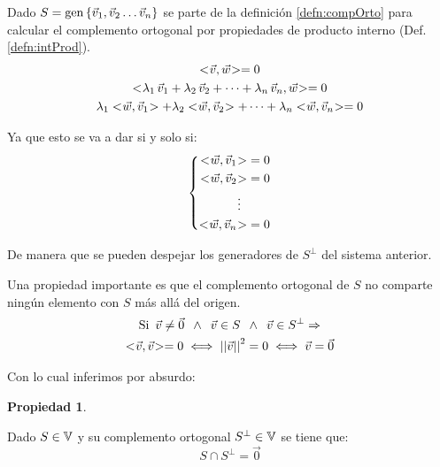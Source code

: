 \documentclass[a5paper,12pt,twoside]{book}
\newtheorem{prop}{{Propiedad}}[chapter]
\begin{document}
Dado $S=\operatorname{gen}{ \left\{ {\Vec{v}_1,\Vec{v}_2 \dots \Vec{v}_n} \right\} }$ se parte de la definición \ref{defn:compOrto} para calcular el complemento ortogonal por propiedades de producto interno (Def. \ref{defn:intProd}).
\begin{gather*}
    \intProd{\Vec{v}}{\Vec{w}} = 0
    \\
    \intProd{\lambda_1 \, \Vec{v}_1 + \lambda_2 \, \Vec{v}_2 + \dots + \lambda_\nth \, \Vec{v}_\nth}{\Vec{w}} = 0
    \\
    \lambda_1 \intProd{\Vec{w}}{\Vec{v}_1} + \lambda_2 \intProd{\Vec{w}}{\Vec{v}_2} + \dots + \lambda_\nth \intProd{\Vec{w}}{\Vec{v}_\nth} = 0
\end{gather*}

Ya que esto se va a dar si y solo si:
\begin{equation*}
    \left\{
    \begin{aligned}
        <\hspace{-0.8mm}\Vec{w},\Vec{v}_1\hspace{-0.8mm}> &= 0
        \\
        <\hspace{-0.8mm}\Vec{w},\Vec{v}_2\hspace{-0.8mm}> &= 0
        \\
        \vdots \enspace &
        \\
        <\hspace{-0.8mm}\Vec{w},\Vec{v}_n\hspace{-0.8mm}> &= 0
    \end{aligned}
    \right.
\end{equation*}

De manera que se pueden despejar los generadores de $S^\perp$ del sistema anterior.

Una propiedad importante es que el complemento ortogonal de $S$ no comparte ningún elemento con $S$ más allá del origen.
\begin{gather*}
    \textrm{Si} \enspace \Vec{v} \neq \Vec{0} \enspace \land \enspace \Vec{v} \in S \enspace \land \enspace \Vec{v} \in S^\perp \Rightarrow
    \\
    <\hspace{-0.8mm}\Vec{v},\Vec{v}\hspace{-0.8mm}> = 0 \iff {\left|\left| {\Vec{v}} \right|\right|}^2 = 0 \iff \Vec{v} = \Vec{0}
\end{gather*}

Con lo cual inferimos por absurdo:

\begin{mdframed}[style=MyFrame1]
    \begin{prop}
    \end{prop}
    Dado $S \in \mathbb{V}$ y su complemento ortogonal $S^\perp \in \mathbb{V}$ se tiene que:
    \begin{equation*}
        S \cap S^\perp = \Vec{0}
    \end{equation*}
\end{mdframed}
\end{document}
